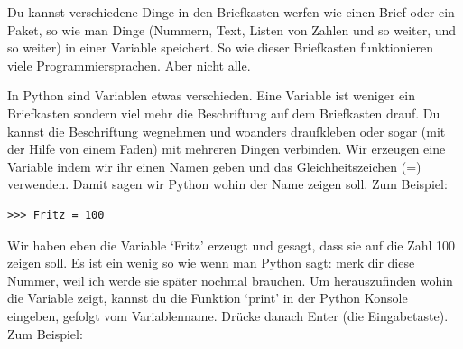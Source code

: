 Du kannst verschiedene Dinge in den Briefkasten werfen wie einen Brief oder ein Paket, so wie man Dinge (Nummern, Text, Listen von Zahlen und so weiter, und so weiter) in einer Variable speichert. So wie dieser Briefkasten funktionieren viele Programmiersprachen. Aber nicht alle.

In Python sind Variablen etwas verschieden. Eine Variable ist weniger ein Briefkasten sondern viel mehr die Beschriftung auf dem Briefkasten drauf. Du kannst die Beschriftung wegnehmen und woanders draufkleben oder sogar (mit der Hilfe von einem Faden) mit mehreren Dingen verbinden. Wir erzeugen eine Variable indem wir ihr einen Namen geben und das Gleichheitszeichen (=) verwenden. Damit sagen wir Python wohin der Name zeigen soll. Zum Beispiel:

\begin{Verbatim}[frame=single]
>>> Fritz = 100
\end{Verbatim}

Wir haben eben die Variable `Fritz' erzeugt und gesagt, dass sie auf die Zahl 100 zeigen soll. Es ist ein wenig so wie wenn man Python sagt: merk dir diese Nummer, weil ich werde sie später nochmal brauchen. Um herauszufinden wohin die Variable zeigt, kannst du die Funktion `print' in der Python Konsole eingeben, gefolgt vom Variablenname. Drücke danach Enter (die Eingabetaste). Zum Beispiel:

